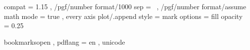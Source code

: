
\usepackage{fontspec}
\usepackage{polyglossia}
	\setdefaultlanguage{english}
\usepackage{amsmath}  %
\usepackage[math-style=ISO]{unicode-math}

\usepackage[noend]{algpseudocode}
	\algrenewcommand{}
	\algrenewcommand{}
\usepackage[backend=biber, maxbibnames=42, maxcitenames=42, sorting=ynt, style=authoryear]{biblatex}
\usepackage{csquotes}
\usepackage{mathtools}
\usepackage{media9}
\usepackage{scalerel}
\usepackage{standalone}
\usepackage{tikz}
	\usetikzlibrary{arrows.meta}
	\usetikzlibrary{backgrounds}
	\usetikzlibrary{calc}
	\usetikzlibrary{decorations}
	\usetikzlibrary{decorations.pathmorphing}
	\usetikzlibrary{decorations.pathreplacing}
	\usetikzlibrary{fadings}
	\usetikzlibrary{fit}
	\usetikzlibrary{graphs}
	\usetikzlibrary{graphdrawing}
	\usetikzlibrary{intersections}
	\usetikzlibrary{positioning}
	\usetikzlibrary{quotes}
	\usetikzlibrary{shadows.blur}
	\usetikzlibrary{shapes.arrows}
	\usetikzlibrary{shapes.geometric}
\usepackage{xifthen}
\usepackage{xspace}

\usepackage{pgfplots}
	\pgfplotsset
		{ compat = 1.15
		, /pgf/number format/1000 sep = {\,}
		, /pgf/number format/assume math mode = true
		, every axis plot/.append style =
			{ mark options = {fill opacity = 0.25}
			}
		}
\usepackage{pgfplotstable}

\hypersetup
	{ bookmarksopen
	, pdflang = en
	, unicode
	}








